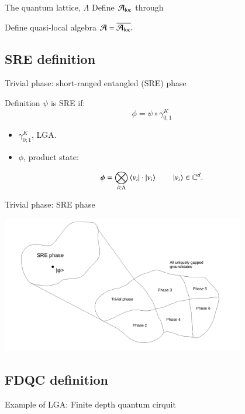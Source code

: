 \documentclass{beamer}
\begin{document}
\begin{frame}{The quantum lattice, $\Lambda$}
	Define $\AA_{\text{loc}}$ through
	\begin{center}
		
	\end{center}
	\pause
	Define quasi-local algebra $\AA=\overline{\AA_{\text{loc}}}.$
\end{frame}

\subsection{SRE definition}

\begin{frame}{Trivial phase: short-ranged entangled (SRE) phase}
	\begin{block}{Definition}
		$\psi$ is SRE if:
		\[\phi=\psi\circ \gamma^K_{0;1}\]
		\begin{itemize}
			\item $\gamma^K_{0;1}$, LGA.
			\item $\phi$, product state:
		\end{itemize}
		\[\phi=\bigotimes_{i\in\Lambda}\bra{v_i}\cdot\ket{v_i}\qquad \ket{v_i}\in\CC^d.\]
	\end{block}
\end{frame}

\begin{frame}{Trivial phase: SRE phase}
	\begin{center}
		\includegraphics[trim={1.5cm 0 2cm 0},clip,width=0.8\textwidth]{Figures/SRE_Phase.pdf}
	\end{center}
\end{frame}

\subsection{FDQC definition}

\begin{frame}{Example of LGA: Finite depth quantum cirquit}
	\begin{center}
		
	\end{center}
\end{frame}
\end{document}
